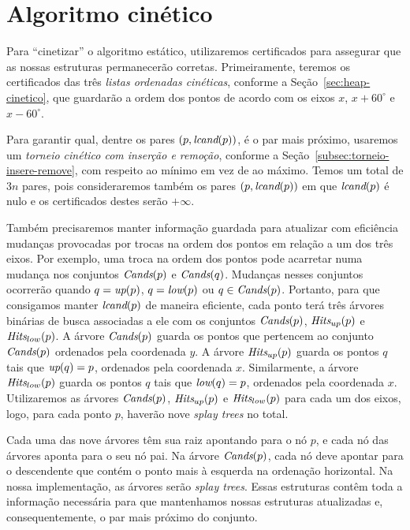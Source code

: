 
\FloatBarrier


\section{Algoritmo cinético}\label{sec:algoritmo-cinetico}

Para ``cinetizar'' o algoritmo estático, utilizaremos certificados para assegurar que as nossas
estruturas permanecerão corretas.
Primeiramente, teremos os certificados das três \textit{listas ordenadas cinéticas}, conforme a
Seção~\ref{sec:heap-cinetico}, que guardarão a ordem dos pontos de acordo com os eixos $x$, $x +
60^\circ$ e $x - 60^\circ$.

Para garantir qual, dentre os pares $(p, \textit{lcand}(p))$, é o par mais próximo, usaremos um
\textit{torneio cinético com inserção e remoção}, conforme a Seção~\ref{subsec:torneio-insere-remove},
com respeito ao mínimo em vez de ao máximo.
Temos um total de $3n$ pares, pois consideraremos também os pares $(p, \textit{lcand}(p))$ em que
$\textit{lcand}(p)$ é nulo e os certificados destes serão $+\infty$.

Também precisaremos manter informação guardada para atualizar com eficiência mudanças provocadas
por trocas na ordem dos pontos em relação a um dos três eixos.
Por exemplo, uma troca na ordem dos pontos pode acarretar numa mudança nos conjuntos $\textit{Cands}(p)$ e
$\textit{Cands}(q)$.
Mudanças nesses conjuntos ocorrerão quando $q = \textit{up}(p)$, $q = \textit{low}(p)$ ou $q \in \textit{Cands}(p)$.
Portanto, para que consigamos manter $\textit{lcand}(p)$ de maneira eficiente, cada ponto terá três árvores
binárias de busca associadas a ele com os conjuntos $\textit{Cands}(p)$, $\textit{Hits}_{up}(p)$ e $\textit{Hits}_{low}(p)
$.
A árvore $\textit{Cands}(p)$ guarda os pontos que pertencem ao conjunto $\textit{Cands}(p)$ ordenados pela
coordenada $y$.
A árvore $\textit{Hits}_{up}(p)$ guarda os pontos $q$ tais que $\textit{up}(q) = p$, ordenados pela coordenada $x$.
Similarmente, a árvore $\textit{Hits}_{low}(p)$ guarda os pontos $q$ tais que $\textit{low}(q) = p$, ordenados
pela coordenada $x$.
Utilizaremos as árvores $\textit{Cands}(p)$, $\textit{Hits}_{up}(p)$ e $\textit{Hits}_{low}(p)$ para cada um dos eixos,
logo, para cada ponto $p$, haverão nove \textit{splay trees} no total.

Cada uma das nove árvores têm sua raiz apontando para o nó $p$, e cada nó das árvores aponta para
o seu nó pai.
Na árvore $\textit{Cands}(p)$, cada nó deve apontar para o descendente que contém o ponto mais à esquerda
na ordenação horizontal.
Na nossa implementação, as árvores serão \textit{splay trees}.
Essas estruturas contêm toda a informação necessária para que mantenhamos nossas estruturas
atualizadas e, consequentemente, o par mais próximo do conjunto.

